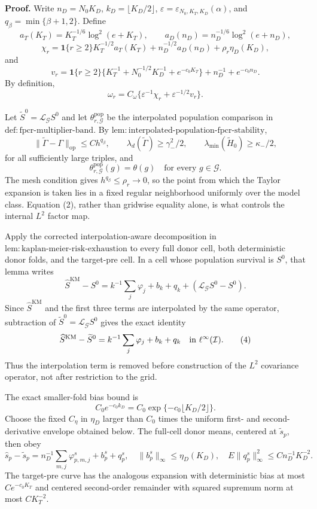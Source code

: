 \textbf{Proof.}
Write \(n_D=N_0K_D\), \(k_D=\lfloor K_D/2\rfloor\), \(\varepsilon=\varepsilon_{N_0,K_T,K_D}(\alpha)\), and \(q_\beta=\min\{\beta+1,2\}\). Define
\[
 a_T(K_T)=K_T^{-1/6}\log^2(e+K_T),
 \qquad
 a_D(n_D)=n_D^{-1/6}\log^2(e+n_D),
\]
\[
 \chi_r=\mathbf 1\{r\ge2\}K_T^{-1/2}a_T(K_T)
       +n_D^{-1/2}a_D(n_D)+\rho_r\eta_D(K_D),
\]
and
\[
 v_r=\mathbf 1\{r\ge2\}
 \{K_T^{-1}+N_0^{-1/2}K_D^{-1}+e^{-c_0K_T}\}
 +n_D^{-1}+e^{-c_0n_D}.
\]
By definition,
\[
 \omega_r=C_\omega\{\varepsilon^{-1}\chi_r+\varepsilon^{-1/2}v_r\}. \tag{1}
\]

Let \(\widetilde S^0=\mathcal L_{\mathcal G}S^0\) and let \(\theta^{\mathrm{pop}}_{r,\mathcal G}\) be the interpolated population comparison in \(\mathrm{def:fpcr\mbox{-}multiplier\mbox{-}band}\). By \(\mathrm{lem:interpolated\mbox{-}population\mbox{-}fpcr\mbox{-}stability}\),
\[
 \|\widetilde\Gamma-\Gamma\|_{\mathrm{op}}
 \le C h^{q_\beta},
 \qquad
 \lambda_d(\widetilde\Gamma)\ge\gamma_-^2/2,
 \qquad
 \lambda_{\min}(\widetilde H_0)\ge\kappa_-/2, \tag{2}
\]
for all sufficiently large triples, and
\[
 \theta^{\mathrm{pop}}_{r,\mathcal G}(g)=\theta(g)
 \quad\text{for every }g\in\mathcal G. \tag{3}
\]
The mesh condition gives \(h^{q_\beta}\le\rho_r\to0\), so the point from which the Taylor expansion is taken lies in a fixed regular neighborhood uniformly over the model class. Equation (2), rather than gridwise equality alone, is what controls the internal \(L^2\) factor map.

Apply the corrected interpolation-aware decomposition in \(\mathrm{lem:kaplan\mbox{-}meier\mbox{-}risk\mbox{-}exhaustion}\) to every full donor cell, both deterministic donor folds, and the target-pre cell. In a cell whose population survival is \(S^0\), that lemma writes
\[
 \widehat S^{\mathrm{KM}}-S^0
 =k^{-1}\sum_j\varphi_j+b_k+q_k+
   (\mathcal L_{\mathcal G}S^0-S^0).
\]
Since \(\widehat S^{\mathrm{KM}}\) and the first three terms are interpolated by the same operator, subtraction of \(\widetilde S^0=\mathcal L_{\mathcal G}S^0\) gives the exact identity
\[
 \widehat S^{\mathrm{KM}}-\widetilde S^0
 =k^{-1}\sum_j\varphi_j+b_k+q_k
 \quad\hbox{in }\ell^\infty(\mathcal I). \tag{4}
\]
Thus the interpolation term is removed before construction of the \(L^2\) covariance operator, not after restriction to the grid.

The exact smaller-fold bias bound is
\[
 C_0e^{-c_0k_D}=C_0\exp\{-c_0\lfloor K_D/2\rfloor\}. \tag{5}
\]
Choose the fixed \(C_\eta\) in \(\eta_D\) larger than \(C_0\) times the uniform first- and second-derivative envelope obtained below. The full-cell donor means, centered at \(\widetilde s_p\), then obey
\[
 \widehat s_p-\widetilde s_p
 =n_D^{-1}\sum_{m,j}\varphi^s_{p,m,j}+b^s_p+q^s_p,
 \quad
 \|b^s_p\|_\infty\le\eta_D(K_D),
 \quad
 E\|q^s_p\|_\infty^2\le Cn_D^{-1}K_D^{-2}. \tag{6}
\]
The target-pre curve has the analogous expansion with deterministic bias at most \(Ce^{-c_0K_T}\) and centered second-order remainder with squared supremum norm at most \(CK_T^{-2}\).

